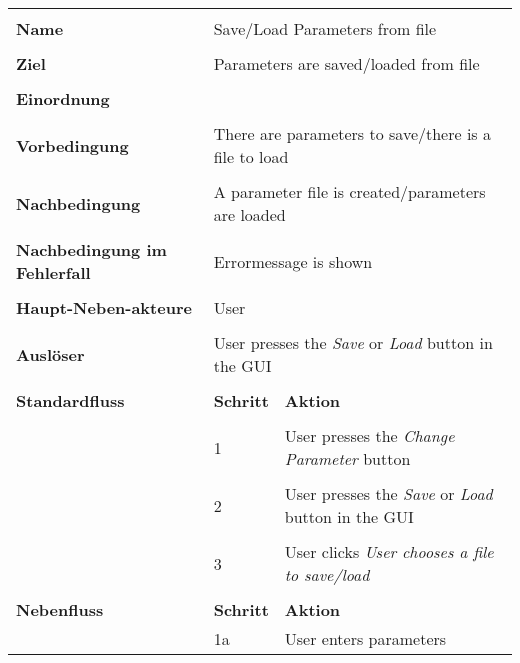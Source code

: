 {\begin{tabular}{|p{5cm}|p{2cm}|p{3cm}|}
\hline \\
\textbf{Name} & \multicolumn{2}{p{5cm}|}{Save/Load Parameters from file} \\
\hline \\
\textbf{Ziel} & \multicolumn{2}{p{5cm}|}{Parameters are saved/loaded from file} \\
\hline \\
\textbf{Einordnung} & \multicolumn{2}{p{5cm}|}{} \\
\hline \\
\textbf{Vorbedingung} & \multicolumn{2}{p{5cm}|}{There are parameters to save/there is a file to load} \\
\hline \\
\textbf{Nachbedingung} & \multicolumn{2}{p{5cm}|}{A parameter file is created/parameters are loaded} \\
\hline \\
\textbf{Nachbedingung im Fehlerfall} & \multicolumn{2}{p{5cm}|}{Errormessage is shown}\\
\hline \\
\textbf{Haupt-Neben-akteure} & \multicolumn{2}{p{5cm}|}{User} \\
\hline \\
\textbf{Ausl\"oser} & \multicolumn{2}{p{5cm}|}{User presses the \textit{Save} or \textit{Load} button in the GUI} \\
\hline \\
\textbf{Standardfluss} & \textbf{Schritt}& \textbf{Aktion} \\
\hline \\
& 1 & User presses the \textit{Change Parameter} button\\
\hline \\
& 2 & User presses the \textit{Save} or \textit{Load} button in the GUI \\
\hline \\
& 3 & User clicks \textit{User chooses a file to save/load}\\
\hline \\
\textbf{Nebenfluss} & \textbf{Schritt} & \textbf{Aktion} \\
& 1a & User enters parameters\\
\hline
\end{tabular}

}
